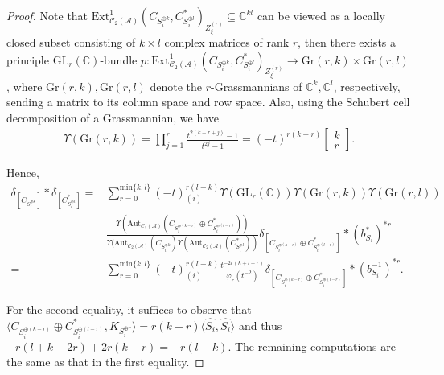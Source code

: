 \documentclass[12pt]{amsart}
\theoremstyle{definition}
\numberwithin{equation}{section}
\begin{document}
\begin{proof}
    
    Note that  $ \mathrm{Ext}^1_{\mathcal{C}_2(\mathcal{A})}(C_{S_i^{\oplus k}}, C_{S_i^{\oplus l}}^* )_{Z_{\xi}^{(r)}} \subseteq \mathbb{C}^{kl} $ can be viewed as a locally closed subset consisting of $ k \times l $ complex matrices of rank $ r $, then there exists a principle $ \mathrm{GL}_r(\mathbb{C}) $-bundle $ p: \mathrm{Ext}^1_{\mathcal{C}_2(\mathcal{A})}(C_{S_i^{\oplus k}}, C_{S_i^{\oplus l}}^* )_{Z_{\xi}^{(r)}} \to \mathrm{Gr}(r,k) \times  \mathrm{Gr}(r,l) $, where $ \mathrm{Gr}(r,k), \mathrm{Gr}(r,l) $ denote the $ r $-Grassmannians of $ \mathbb{C}^k, \mathbb{C}^l $, respectively, sending a matrix to its column space and row space. 
    Also, using the Schubert cell decomposition of a Grassmannian, we have
    \begin{align*}
        \Upsilon(\mathrm{Gr}(r,k)) = \prod_{j=1}^{r} \frac{t^{2(k-r+j)}-1}{t^{2j}-1} = (-t)^{r(k-r)}\begin{bmatrix}
            k \\ r
        \end{bmatrix}.
    \end{align*}

    Hence, 
    \begin{align*}
         \delta_{[C_{S_i^{\oplus k}}]} * \delta_{[C_{S_i^{\oplus l}}^*]}=&\sum_{r=0}^{\mathrm{min}\{k,l\}} (-t)_{(i)}^{r(l-k)} \Upsilon(\mathrm{GL}_r(\mathbb{C})) \Upsilon(\mathrm{Gr}(r,k)) \Upsilon(\mathrm{Gr}(r,l))\\
        &\frac{\Upsilon(\mathrm{Aut}_{\mathcal{C}_2(\mathcal{A})}(C_{S_i^{\oplus (k-r)}} \oplus C_{S_i^{\oplus (l-r)}}^*)) }{\Upsilon(\mathrm{Aut}_{\mathcal{C}_2(\mathcal{A})}(C_{S_i^{\oplus k}})\Upsilon(\mathrm{Aut}_{\mathcal{C}_2(\mathcal{A})}(C_{S_i^{\oplus l}}^*))  }\delta_{[C_{S_i^{\oplus (k-r)}} \oplus C_{S_i^{\oplus (l-r)}}^*]} * (b_{S_i}^*)^{*r} \\
        =& \sum_{r=0}^{\mathrm{min}\{k,l\}} (-t)_{(i)}^{r(l-k)} \frac{t^{-2r(k+l-r)}}{\varphi_r(t^{-2})} \delta_{[C_{S_i^{\oplus (k-r)}} \oplus C_{S_i^{\oplus (l-r)}}^*]} * (b_{S_i}^{-1})^{*r}.
    \end{align*}

    For the second equality, it suffices to observe that $ \langle C_{S_i^{\oplus (k-r)}} \oplus C_{S_i^{\oplus (l-r)}}^*,K_{S_i^{\oplus r}}\rangle = r(k-r)\langle \widehat{S_i},\widehat{S_i} \rangle  $ and thus $ -r(l+k-2r) + 2 r(k-r) = -r(l-k)  $. 
    The remaining computations are the same as that in the first equality. 
\end{proof}
\end{document}
